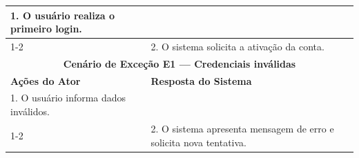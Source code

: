 \begin{longtable}{| p{} | p{} |}
1. O usuário realiza o primeiro login. & \\
\cline{1-2}

&
2. O sistema solicita a ativação da conta. \\
\hline

\multicolumn{2}{|c|}{\textbf{Cenário de Exceção E1 --- Credenciais inválidas}} \\
\hline

\textbf{Ações do Ator} &
\textbf{Resposta do Sistema} \\
\hline

1. O usuário informa dados inválidos. & \\
\cline{1-2}

&
2. O sistema apresenta mensagem de erro e solicita nova tentativa. \\
\hline

\end{longtable}
